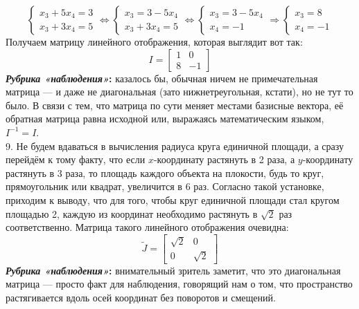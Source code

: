 \documentclass[a3paper,14pt]{extarticle}
\begin{document}
$$\begin{cases}
    x_3 + 5x_4 = 3 \\ x_3 + 3x_4 = 5
\end{cases} \Leftrightarrow \begin{cases}
    x_3 = 3 - 5x_4 \\ x_3 + 3x_4 = 5
\end{cases} \Leftrightarrow \begin{cases}
    x_3 = 3 - 5x_4 \\ x_4 = -1
\end{cases} \Rightarrow \begin{cases}
    x_3 = 8 \\ x_4 = -1
\end{cases}
$$
Получаем матрицу линейного отображения, которая выглядит вот так:
$$I = \begin{bmatrix}
    1 & 0 \\ 8 & -1
\end{bmatrix}$$
\textbf{\textit{Рубрика «наблюдения»}:} казалось бы, обычная ничем не примечательная матрица --- и даже не диагональная (зато нижнетреугольная, кстати), но не тут то было. В связи с тем, что матрица по сути меняет местами базисные вектора, её обратная матрица равна исходной или, выражаясь математическим языком, $I^{-1} = I$.\\[1.5em]
9. Не будем вдаваться в вычисления радиуса круга единичной площади, а сразу перейдём к тому факту, что если $x$-координату растянуть в 2 раза, а $y$-координату растянуть в 3 раза, то площадь каждого объекта на плокости, будь то круг, прямоугольник или квадрат, увеличится в 6 раз. Согласно такой установке, приходим к выводу, что для того, чтобы круг единичной площади стал кругом площадью 2, каждую из координат необходимо растянуть в $\sqrt{2}$ раз соответственно. Матрица такого линейного отображения очевидна:
$$\tilde{J} = \begin{bmatrix}
    \sqrt{2} & 0 \\ 0 & \sqrt{2}
\end{bmatrix}$$
\textbf{\textit{Рубрика «наблюдения»}:} внимательный зритель заметит, что это диагональная матрица --- просто факт для наблюдения, говорящий нам о том, что пространство растягивается вдоль осей координат без поворотов и смещений.\pagebreak
\end{document}
